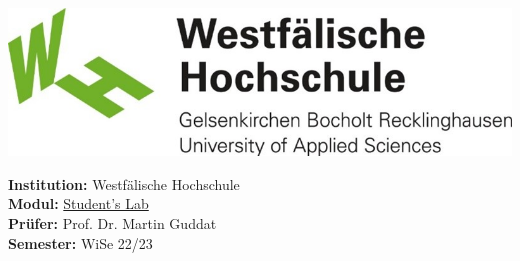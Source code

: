 \begin{titlepage}
    \maketitle
    \vspace{2cm}
    \begin{center}
        \includegraphics[width=\paperwidth/2]{../assets/img/whs}
    \end{center}
    \vspace*{\fill}
    \begin{flushleft}
        \Large{\textbf{Institution:} Westfälische Hochschule}\\
        \Large{\textbf{Modul:} \href{https://moodle.w-hs.de/course/view.php?id=36}{Student's Lab}} \\
        \Large{\textbf{Prüfer:} Prof. Dr. Martin Guddat}\\
        \Large{\textbf{Semester:} WiSe 22/23}
    \end{flushleft}
\end{titlepage}
